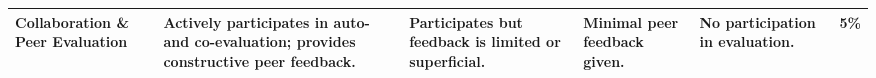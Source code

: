\documentclass[10pt, landscape]{article}
\begin{document}
\begin{table}
\begin{tabular}{@{}p{4cm}p{5cm}p{5cm}p{4cm}p{4cm}c@{}}
\textbf{Collaboration \& Peer Evaluation} & Actively participates in auto- and co-evaluation; provides constructive peer feedback. & Participates but feedback is limited or superficial. & Minimal peer feedback given. & No participation in evaluation. & 5\% \\ \bottomrule
\end{tabular}%
\end{table}
\end{document}
